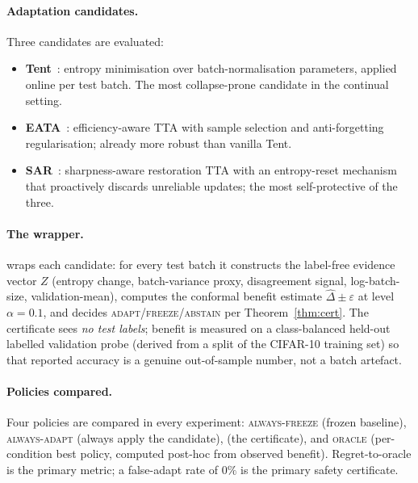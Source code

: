 \paragraph{Adaptation candidates.}
Three candidates are evaluated:
\begin{itemize}
\item \textbf{Tent}~\cite{wang2021tent}: entropy minimisation over
  batch-normalisation parameters, applied online per test batch.  The most
  collapse-prone candidate in the continual setting.
\item \textbf{EATA}~\cite{niu2022eata}: efficiency-aware TTA with sample
  selection and anti-forgetting regularisation; already more robust than
  vanilla Tent.
\item \textbf{SAR}~\cite{niu2023sar}: sharpness-aware restoration TTA with
  an entropy-reset mechanism that proactively discards unreliable updates;
  the most self-protective of the three.
\end{itemize}

\paragraph{The \KGA{} wrapper.}
\KGA{} wraps each candidate: for every test batch it constructs the
label-free evidence vector $Z$ (entropy change, batch-variance proxy,
disagreement signal, log-batch-size, validation-mean), computes the
conformal benefit estimate $\widehat{\Delta} \pm \varepsilon$ at level
$\alpha{=}0.1$, and decides \textsc{adapt}/\textsc{freeze}/\textsc{abstain}
per Theorem~\ref{thm:cert}.  The certificate sees \emph{no test labels};
benefit is measured on a class-balanced held-out labelled validation probe
(derived from a split of the CIFAR-10 training set) so that reported
accuracy is a genuine out-of-sample number, not a batch artefact.

\paragraph{Policies compared.}
Four policies are compared in every experiment: \textsc{always-freeze}
(frozen baseline), \textsc{always-adapt} (always apply the candidate),
\textbf{\KGA{}} (the certificate), and \textsc{oracle} (per-condition best
policy, computed post-hoc from observed benefit).  Regret-to-oracle is the
primary metric; a false-adapt rate of $0\%$ is the primary safety
certificate.

